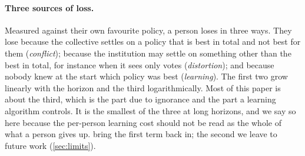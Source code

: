 \documentclass[11pt,a4paper]{article}
\theoremstyle{plain}
\theoremstyle{definition}
\theoremstyle{remark}
\begin{document}
\paragraph{Three sources of loss.} Measured against their own favourite policy, a person loses in three ways. They lose because the collective settles on a policy that is best in total and not best for them (\emph{conflict}); because the institution may settle on something other than the best in total, for instance when it sees only votes (\emph{distortion}); and because nobody knew at the start which policy was best (\emph{learning}). The first two grow linearly with the horizon and the third logarithmically. Most of this paper is about the third, which is the part due to ignorance and the part a learning algorithm controls. It is the smallest of the three at long horizons, and we say so here because the per-person learning cost should not be read as the whole of what a person gives up.  bring the first term back in; the second we leave to future work (\cref{sec:limits}).
\end{document}
